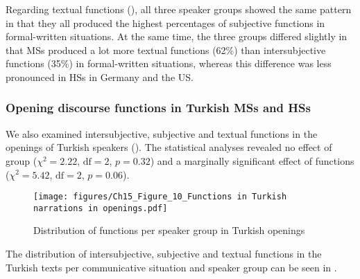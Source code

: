 \documentclass[output=paper,colorlinks,citecolor=brown]{langscibook}
\begin{document}
Regarding textual functions (), all three speaker groups showed the same pattern in that they all produced the highest percentages of subjective functions in formal-written situations. At the same time, the three groups differed slightly in that MSs produced a lot more textual functions (62\%) than intersubjective functions (35\%) in formal-written situations, whereas this difference was less pronounced in HSs in Germany and the US. 

\subsubsection{Opening discourse functions in Turkish MSs and HSs}
We also examined intersubjective, subjective and textual functions in the openings of Turkish speakers (). The statistical analyses revealed no effect of group ($\chi^2= 2.22$, $\text{df} = 2$, $p = 0.32$) and a marginally significant effect of functions ($\chi^2 = 5.42$, $\text{df} = 2$, $p = 0.06$).

\begin{figure}
    \centering
    \texttt{[image: figures/Ch15\_Figure\_10\_Functions in Turkish narrations in openings.pdf]}
    \caption{Distribution of functions per speaker group in Turkish openings}
    \label{fig:katsikaetal:Turkishfunctionsopenings}
\end{figure}

The distribution of intersubjective, subjective and textual functions in the Turkish texts per communicative situation and speaker group can be seen in . 
\end{document}
